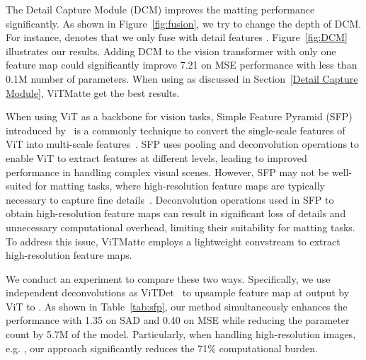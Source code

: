 \documentclass[10pt,twocolumn,letterpaper]{article}
\newcommand{\thename}{ViTMatte}
\begin{document}
The Detail Capture Module (DCM) improves the matting performance significantly. As shown in Figure~\ref{fig:fusion}, we try to change the depth of DCM. For instance,  denotes that we only fuse with detail features . Figure~\ref{fig:DCM} illustrates our results. Adding DCM to the vision transformer with only one feature map could significantly improve 7.21 on MSE performance with less than 0.1M number of parameters. When using  as discussed in Section~\ref{Detail Capture Module}, \thename{} get the best results.

When using ViT as a backbone for vision tasks,  Simple Feature Pyramid (SFP) introduced by~\cite{vitdet} is a commonly technique to convert the single-scale features of ViT into multi-scale features~\cite{he2022masked, EVA, EVA02}. SFP uses pooling and deconvolution operations to enable ViT to extract features at different levels,  leading to improved performance in handling complex visual scenes. However, SFP may not be well-suited for matting tasks, where high-resolution feature maps are typically necessary to capture fine details~\cite{rmat}. Deconvolution operations used in SFP to obtain high-resolution feature maps can result in significant loss of details and unnecessary computational overhead, limiting their suitability for matting tasks. To address this issue, \thename{} employs a lightweight convstream to extract high-resolution feature maps.

We conduct an experiment to compare these two ways. Specifically, we use independent deconvolutions as ViTDet~\cite{vitdet} to upsample feature map at  output by ViT to . As shown in Table~\ref{tab:sfp}, our method simultaneously enhances the performance with 1.35 on SAD and 0.40 on MSE while reducing the parameter count by 5.7M of the model. Particularly, when handling high-resolution images, e.g. , our approach significantly reduces the 71\% computational burden.
\end{document}
